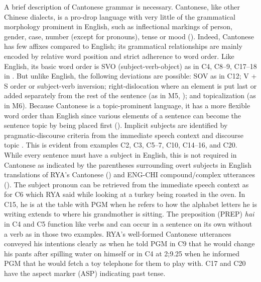 \documentclass[output=paper,colorlinks,citecolor=brown]{langscibook}
\begin{document}
A brief description of Cantonese grammar is necessary. Cantonese, like other Chinese dialects, is a pro-drop language with very little of the grammatical morphology prominent in English, such as inflectional markings of person, gender, case, number (except for pronouns), tense or mood (\citealt{MatthewsYip2011}). Indeed, Cantonese has few affixes compared to English; its grammatical relationships are mainly encoded by relative word position and strict adherence to word order. Like English, its basic word order is SVO (subject-verb-object) as in C4, C8–9, C17–18 in . But unlike English, the following deviations are possible:  SOV as in C12;  V + S order or subject-verb inversion;  right-dislocation where an element is put last or added separately from the rest of the sentence (as in M5, ); and  topicalization (as in M6). Because Cantonese is a topic-prominent language, it has a more flexible word order than English since various elements of a sentence can become the sentence topic by being placed first (\citealt{MatthewsYip2011}). Implicit subjects are identified by pragmatic-discourse criteria from the immediate speech context and discourse topic \citep{LukeEtAl2003}. This is evident from examples C2, C3, C5–7, C10, C14–16, and C20. While every sentence must have a subject in English, this is not required in Cantonese as indicated by the parentheses surrounding overt subjects in English translations of RYA’s Cantonese () and ENG-CHI compound/complex utterances (). The subject pronoun can be retrieved from the immediate speech context as for C6 which RYA said while looking at a turkey being roasted in the oven. In C15, he is at the table with PGM when he refers to how the alphabet letters he is writing extends to where his grandmother is sitting. The preposition (PREP) \textit{hai} in C4 and C5 function like verbs and can occur in a sentence on its own without a verb as in those two examples. RYA’s well-formed Cantonese utterances conveyed his intentions clearly as when he told PGM in C9 that he would change his pants after spilling water on himself or in C4 at 2;9.25 when he informed PGM that he would fetch a toy telephone for them to play with. C17 and C20 have the aspect marker (ASP) indicating past tense.
\end{document}
